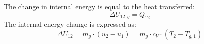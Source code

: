 The change in internal energy is equal to the heat transferred:  
\[
\Delta U_{12,g} = Q_{12}
\]  
The internal energy change is expressed as:  
\[
\Delta U_{12} = m_g \cdot (u_2 - u_1) = m_g \cdot c_V \cdot (T_2 - T_{g,1})
\]